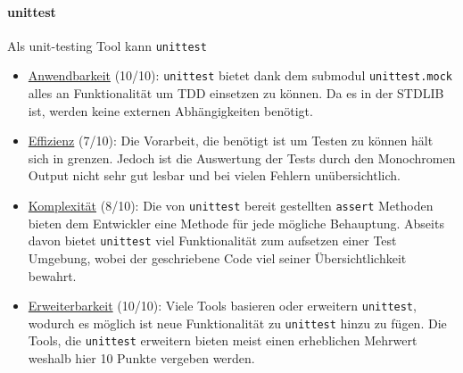 \paragraph{unittest}\label{zusammenfassung:unit:unittest}\mbox{}
Als unit-testing Tool kann \lstinline{unittest} 
\begin{itemize}
    \item \underline{Anwendbarkeit} (10/10):\newline
    \lstinline{unittest} bietet dank dem submodul \lstinline{unittest.mock}
    alles an Funktionalität um TDD einsetzen zu können. Da es in der STDLIB ist,
    werden keine externen Abhängigkeiten benötigt.
    
    \item \underline{Effizienz} (7/10):\newline
    Die Vorarbeit, die benötigt ist um Testen zu können hält sich in grenzen.
    Jedoch ist die Auswertung der Tests durch den Monochromen Output nicht
    sehr gut lesbar und bei vielen Fehlern unübersichtlich.
    
    \item \underline{Komplexität} (8/10):\newline
    Die von \lstinline{unittest} bereit gestellten \lstinline{assert} Methoden
    bieten dem Entwickler eine Methode für jede mögliche Behauptung. Abseits
    davon bietet \lstinline{unittest} viel Funktionalität zum aufsetzen einer
    Test Umgebung, wobei der geschriebene Code viel seiner Übersichtlichkeit
    bewahrt.
    
    \item \underline{Erweiterbarkeit} (10/10):\newline
    Viele Tools basieren oder erweitern \lstinline{unittest}, wodurch es möglich
    ist neue Funktionalität zu \lstinline{unittest} hinzu zu fügen. Die Tools,
    die \lstinline{unittest} erweitern bieten meist einen erheblichen Mehrwert
    weshalb hier 10 Punkte vergeben werden.
\end{itemize}

